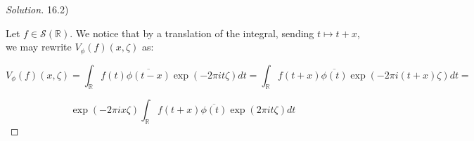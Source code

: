 \documentclass[10pt]{article}
\begin{document}
\begin{proof}[Solution]
16.2)

Let $f \in \mathcal{S}(\mathbb{R})$. We notice that by a translation of the integral, sending $t \mapsto t + x$, we may rewrite $V_\phi(f)(x, \zeta)$ as:

$$ V_\phi(f)(x, \zeta) = \int_{\mathbb{R}} f(t) \overline{\phi(t - x)} \exp(-2 \pi i t \zeta) dt = \int_\mathbb{R} f(t + x) \overline{\phi(t)} \exp(-2 \pi i (t + x) \zeta) dt = $$

$$ \exp(-2\pi i x \zeta) \int_\mathbb{R} f(t + x) \overline{\phi(t)} \exp(2\pi i t \zeta) dt $$



\end{proof}
\end{document}
